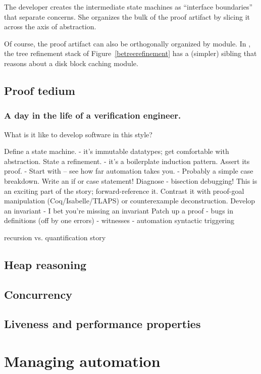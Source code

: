 The developer creates the intermediate state machines as
``interface boundaries'' that separate concerns.
She organizes the bulk of the proof artifact
by slicing it across the axis of abstraction.

Of course, the proof artifact can also be orthogonally organized
by module.
In {\veribetrfs},
the {\bepsilon}tree refinement stack of Figure~\ref{betreerefinement}
has a (simpler) sibling that reasons about a disk block caching module.

\subsection{Proof tedium}

\subsubsection{A day in the life of a verification engineer.}
What is it like to develop software in this style?

Define a state machine.
- it's immutable datatypes; get comfortable with abstraction.
State a refinement.
- it's a boilerplate induction pattern.
Assert its proof.
- Start with {} -- see how far automation takes you.
- Probably a simple case breakdown. Write an if or case statement!
Diagnose
- bisection debugging! This is an exciting part of the story;
  forward-reference it. Contrast it with proof-goal manipulation
  (Coq/Isabelle/TLAPS) or counterexample deconstruction.
Develop an invariant
- I bet you're missing an invariant
Patch up a proof
- bugs in definitions (off by one errors)
- witnesses
- automation syntactic triggering

recursion vs. quantification story

\subsection{Heap reasoning}

\subsection{Concurrency}

\subsection{Liveness and performance properties}

\section{Managing automation}
